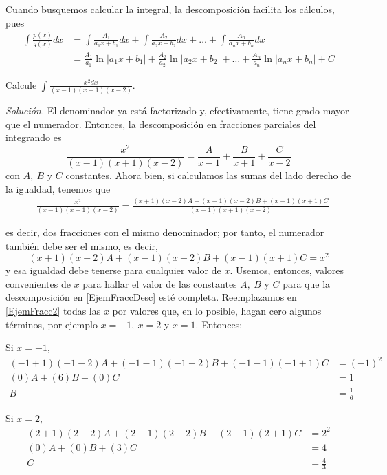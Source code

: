 Cuando busquemos calcular la integral, la descomposición facilita los cálculos, pues
{\small
\begin{align*}
\int \frac{p(x)}{q(x)}dx&=\int\frac{A_1}{a_1x+b_1}dx+\int\frac{A_2}{a_2x+b_2}dx
+\ldots+\int\frac{A_n}{a_nx+b_n}dx\\
&=\frac{A_1}{a_1}\ln\vert a_1x+b_1\vert+\frac{A_2}{a_2}\ln\vert a_2x+b_2\vert+\ldots+\frac{A_n}{a_n}\ln\vert a_nx+b_n\vert+C
\end{align*}
}

\begin{ejemplo}
Calcule $\displaystyle{\int \frac{x^{2}dx}{(x-1)(x+1)(x-2)}}$.
\end{ejemplo}
\textit{Solución.} El denominador ya está factorizado y, efectivamente, tiene grado mayor que el numerador. Entonces, la descomposición en fracciones parciales del integrando es
{\small
\begin{equation}\label{EjemFraccDesc}
\frac{x^{2}}{(x-1)(x+1)(x-2)}=\frac{A}{x-1}+\frac{B}{x+1}+\frac{C}{x-2}
\end{equation}
}
con $A,\ B$ y $C$ constantes. Ahora bien, si calculamos las sumas del lado derecho de la igualdad, tenemos que
{\footnotesize
\begin{align}\label{EjemFracc}
&\frac{x^{2}}{(x-1)(x+1)(x-2)}=\frac{(x+1)(x-2)A+(x-1)(x-2)B+
(x-1)(x+1)C}{(x-1)(x+1)(x-2)}
\end{align}
}

es decir, dos fracciones con el mismo denominador; por tanto, el numerador también debe ser el mismo, es decir,
\begin{equation}\label{EjemFracc2}
(x+1)(x-2)A+(x-1)(x-2)B+(x-1)(x+1)C=x^{2}
\end{equation}
y esa igualdad debe tenerse para cualquier valor de $x$. Usemos, entonces, valores convenientes de $x$ para hallar el valor de las constantes $A,\ B$ y $C$ para que la descomposición en \eqref{EjemFraccDesc} esté completa. Reemplazamos en \eqref{EjemFracc2} todas las $x$ por valores que, en lo posible, hagan cero algunos términos, por ejemplo $x=-1,\ x=2$ y $x=1$. Entonces:

Si $x=-1$,
{\small
\begin{align*}
(-1+1)(-1-2)A+(-1-1)(-1-2)B+(-1-1)(-1+1)C&=(-1)^{2} \\
(0)A+(6)B+(0)C&=1 \\
B&=\frac{1}{6}
\end{align*}
}

Si $x=2$,
\begin{align*}
(2+1)(2-2)A+(2-1)(2-2)B+(2-1)(2+1)C&=2^{2} \\
(0)A+(0)B+(3)C&=4 \\
C&=\frac{4}{3}
\end{align*}

